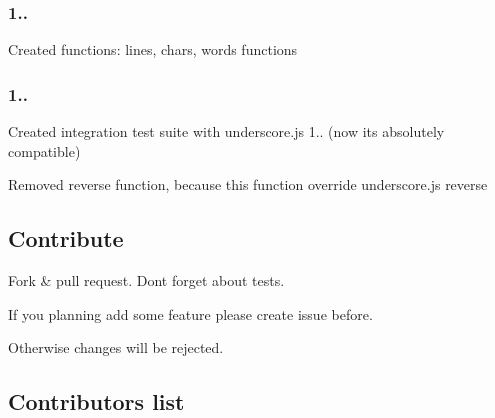\subsubsection*{1..}


\begin{DoxyItemize}
\item Created functions\+: lines, chars, words functions
\end{DoxyItemize}

\subsubsection*{1..}


\begin{DoxyItemize}
\item Created integration test suite with underscore.\+js 1.. (now it\textquotesingle{}s absolutely compatible)
\item Removed \textquotesingle{}reverse\textquotesingle{} function, because this function override underscore.\+js \textquotesingle{}reverse\textquotesingle{}
\end{DoxyItemize}

\subsection*{Contribute}


\begin{DoxyItemize}
\item Fork \& pull request. Don\textquotesingle{}t forget about tests.
\item If you planning add some feature please create issue before.
\end{DoxyItemize}

Otherwise changes will be rejected.

\subsection*{Contributors list}


